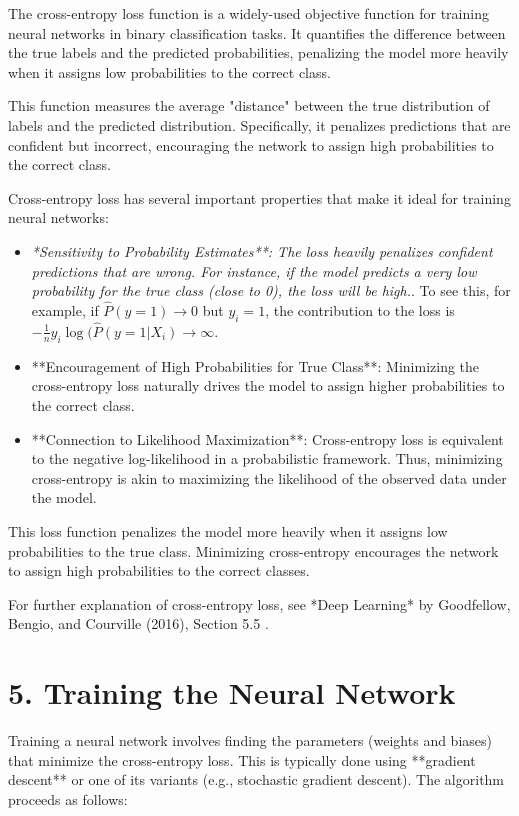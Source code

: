 \documentclass{article}
\begin{document}
The cross-entropy loss function is a widely-used objective function for training neural networks in binary classification tasks. It quantifies the difference between the true labels and the predicted probabilities, penalizing the model more heavily when it assigns low probabilities to the correct class.

This function measures the average "distance" between the true distribution of labels and the predicted distribution. Specifically, it penalizes predictions that are confident but incorrect, encouraging the network to assign high probabilities to the correct class.


Cross-entropy loss has several important properties that make it ideal for training neural networks:
\begin{itemize}
    \item {\em **Sensitivity to Probability Estimates**: The loss heavily penalizes confident predictions that are wrong. For instance, if the model predicts a very low probability for the true class (close to 0), the loss will be high.}. 
To see this, for example, if $\hat{P}(y=1)\to 0 $ but $y_i=1$,
the contribution to the loss is $ -\frac{1}{n} y_i \log(\hat{P}(y=1 | X_i) \to \infty$. 
    \item **Encouragement of High Probabilities for True Class**: Minimizing the cross-entropy loss naturally drives the model to assign higher probabilities to the correct class.
    \item **Connection to Likelihood Maximization**: Cross-entropy loss is equivalent to the negative log-likelihood in a probabilistic framework. Thus, minimizing cross-entropy is akin to maximizing the likelihood of the observed data under the model.
\end{itemize}This loss function penalizes the model more heavily when it assigns low probabilities to the true class. Minimizing cross-entropy encourages the network to assign high probabilities to the correct classes.

For further explanation of cross-entropy loss, see *Deep Learning* by Goodfellow, Bengio, and Courville (2016), Section 5.5 \cite{goodfellow2016deep}.

\section*{5. Training the Neural Network}

Training a neural network involves finding the parameters (weights and biases) that minimize the cross-entropy loss. This is typically done using **gradient descent** or one of its variants (e.g., stochastic gradient descent). The algorithm proceeds as follows:
\end{document}
